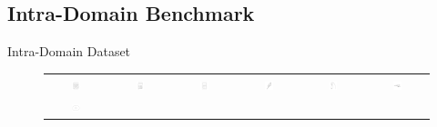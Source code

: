 \documentclass[mathserif]{beamer}
\begin{document}
\subsection{Intra-Domain Benchmark}
\begin{frame}{Intra-Domain Dataset}
    \begin{figure}
        \begin{tabular}{cccccc}
            \includegraphics[width=0.15\textwidth]{illustrations/sketch_examples/calculator_1.png} &
            \includegraphics[width=0.15\textwidth]{illustrations/sketch_examples/calculator_2.png} &
            \includegraphics[width=0.15\textwidth]{illustrations/sketch_examples/calculator_3.png} &
            \includegraphics[width=0.15\textwidth]{illustrations/sketch_examples/parrot_1.png} &
            \includegraphics[width=0.15\textwidth]{illustrations/sketch_examples/parrot_2.png} &
            \includegraphics[width=0.15\textwidth]{illustrations/sketch_examples/parrot_3.png} \\
            \includegraphics[width=0.15\textwidth]{illustrations/sketch_examples/donut_1.png} &

\end{tabular}
\end{figure}
\end{frame}
\end{document}
